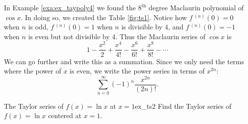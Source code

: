 \begin{solution}
{In Example \ref{exa:ex_taypoly4} we found the $8^\text{th}$ degree Maclaurin polynomial of $\cos x$. In doing so, we created the Table \ref{fig:ts1}.
Notice how $f\,^{(n)}(0)=0$ when $n$ is odd,  $f\,^{(n)}(0)=1$ when $n$ is divisible by $4$, and $f\,^{(n)}(0)=-1$ when $n$ is even but not divisible by 4. Thus the Maclaurin series of $\cos x$ is
$$1-\frac{x^2}2+\frac{x^4}{4!}-\frac{x^6}{6!}+\frac{x^8}{8!} - \cdots$$
We can go further and write this as a summation. Since we only need the terms where the power of $x$ is even, we write the power series in terms of $x^{2n}$:
$$\sum_{n=0}^\infty (-1)^{n}\frac{x^{2n}}{(2n)!}.$$
}
\end{solution}


%
\begin{example}{The Taylor series of $f(x)=\ln x$ at $x=1$}{ex_ts2}
{Find the Taylor series of $f(x) = \ln x$ centered at $x=1$.}
\end{example}


